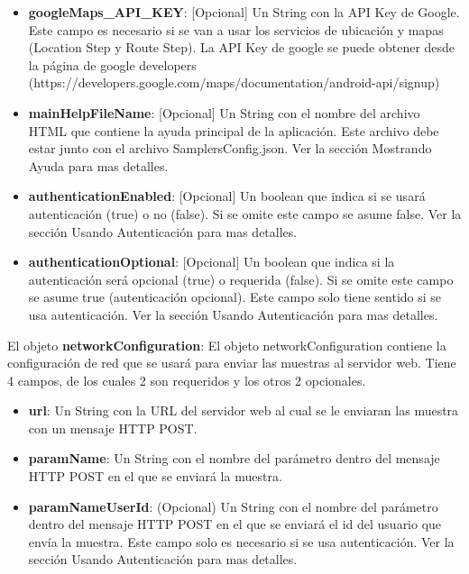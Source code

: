 \begin{itemize}
\begin{itemize}
		 \item \textbf{googleMaps\_API\_KEY}: [Opcional] Un String con la API Key de Google. Este campo es necesario si se van a usar los servicios de ubicación y mapas (Location Step y Route Step). La API Key de google se puede obtener desde la página de google developers (https://developers.google.com/maps/documentation/android-api/signup)
		 
		 \item \textbf{mainHelpFileName}: [Opcional] Un String con el nombre del archivo HTML que contiene la ayuda principal de la aplicación. Este archivo debe estar junto con el archivo SamplersConfig.json. Ver la sección Mostrando Ayuda para mas detalles.
		 
		 \item \textbf{authenticationEnabled}: [Opcional] Un boolean que indica si se usará autenticación (true) o no (false). Si se omite este campo se asume false. Ver la sección Usando Autenticación para mas detalles.
		 
		 \item \textbf{authenticationOptional}: [Opcional] Un boolean que indica si la autenticación será opcional (true) o requerida (false). Si se omite este campo se asume true (autenticación opcional). Este campo solo tiene sentido si se usa autenticación. Ver la sección Usando Autenticación para mas detalles.
		 
	\end{itemize}
	
	
	El objeto \textbf{networkConfiguration}:
	El objeto networkConfiguration contiene la configuración de red que se usará para enviar las muestras al servidor web. Tiene 4 campos, de los cuales 2 son requeridos y los otros 2 opcionales.
	
	\begin{itemize}
	
		\item \textbf{url}: Un String con la URL del servidor web al cual se le enviaran las muestra con un mensaje HTTP POST.
		
		\item \textbf{paramName}: Un String con el nombre del parámetro dentro del mensaje HTTP POST en el que se enviará la muestra.
	
		\item \textbf{paramNameUserId}: (Opcional) Un String con el nombre del parámetro dentro del mensaje HTTP POST en el que se enviará el id del usuario que envía la muestra. Este campo solo es necesario si se usa autenticación. Ver la sección Usando Autenticación para mas detalles.
		

\end{itemize}
\end{itemize}
